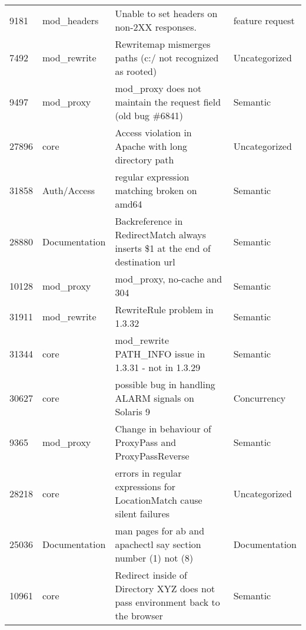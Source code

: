 \begin{longtable}[c]{p{1cm}p{3cm}p{6cm}p{4cm}}
9181   & mod\_headers       & Unable to set headers on non-2XX responses.                                                                    & feature request   \\
7492   & mod\_rewrite       & Rewritemap mismerges paths (c:/ not recognized as rooted)                                                      & Uncategorized     \\
9497   & mod\_proxy         & mod\_proxy does not maintain the request field (old bug \#6841) & Semantic\\
27896  & core               & Access violation in Apache with long directory path                                                            & Uncategorized     \\
31858  & Auth/Access        & regular expression matching broken on amd64                                                                    & Semantic          \\
28880  & Documentation      & Backreference in RedirectMatch always inserts \$1 at the end of destination url                                & Semantic          \\
10128  & mod\_proxy         & mod\_proxy, no-cache and 304                                                                                   & Semantic          \\
31911  & mod\_rewrite       & RewriteRule problem in 1.3.32                                                                                  & Semantic          \\
31344  & core               & mod\_rewrite PATH\_INFO issue in 1.3.31 - not in 1.3.29                                                        & Semantic          \\
30627  & core               & possible bug in handling ALARM signals on Solaris 9                                                            & Concurrency       \\
9365   & mod\_proxy         & Change in behaviour of ProxyPass and ProxyPassReverse                                                          & Semantic          \\
28218  & core               & errors in regular expressions for LocationMatch cause silent failures                                          & Uncategorized     \\
25036  & Documentation      & man pages for ab and apachectl say section number (1) not (8)                                                  & Documentation     \\
10961  & core               & Redirect inside of Directory XYZ does not pass environment back to the browser            & Semantic          \\

\end{longtable}
